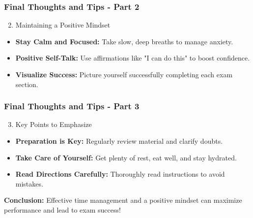 \documentclass{beamer}
\begin{document}
\begin{frame}[fragile]
    \frametitle{Final Thoughts and Tips - Part 2}
    \begin{enumerate}
        \setcounter{enumi}{1}
        \item Maintaining a Positive Mindset
    \end{enumerate}

    \begin{itemize}
        \item \textbf{Stay Calm and Focused:} Take slow, deep breaths to manage anxiety.
        \item \textbf{Positive Self-Talk:} Use affirmations like "I can do this" to boost confidence.
        \item \textbf{Visualize Success:} Picture yourself successfully completing each exam section.
    \end{itemize}
\end{frame}

\begin{frame}[fragile]
    \frametitle{Final Thoughts and Tips - Part 3}
    \begin{enumerate}
        \setcounter{enumi}{2}
        \item Key Points to Emphasize
    \end{enumerate}

    \begin{itemize}
        \item \textbf{Preparation is Key:} Regularly review material and clarify doubts.
        \item \textbf{Take Care of Yourself:} Get plenty of rest, eat well, and stay hydrated.
        \item \textbf{Read Directions Carefully:} Thoroughly read instructions to avoid mistakes.
    \end{itemize}

    \textbf{Conclusion:} Effective time management and a positive mindset can maximize performance and lead to exam success!
\end{frame}
\end{document}
